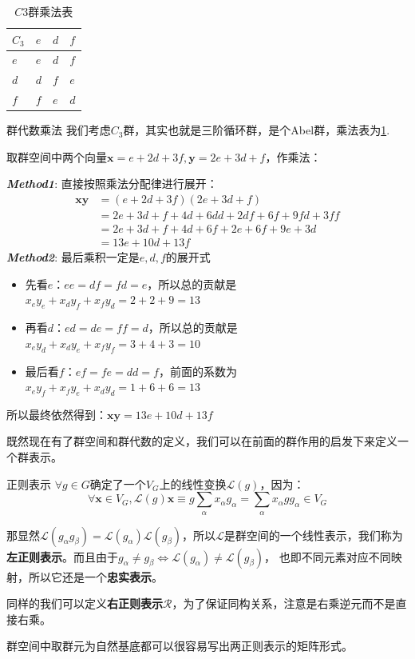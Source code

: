 \begin{table}[h]
    \centering
    \begin{tabular}{l|l|l|l}
    $C_3$ & $e$ & $d$ & $f$ \\ \hline
    $e$   & $e$ & $d$ & $f$ \\ \hline
    $d$   & $d$ & $f$ & $e$ \\ \hline
    $f$   & $f$ & $e$ & $d$
    \end{tabular}
    \caption{$C3$群乘法表}
    \label{tab:D.1}
\end{table}
\begin{example}{群代数乘法}
    我们考虑$C_3$群，其实也就是三阶循环群，是个Abel群，乘法表为\ref{tab:D.1}.

    取群空间中两个向量$\mathbf{x}=e+2d+3f,\mathbf{y}=2e+3d+f$，作乘法：
    
    {\itshape\textbf{Method1}}: 直接按照乘法分配律进行展开：
    \begin{align*}
        \mathbf{x}\mathbf{y}&=(e+2d+3f)(2e+3d+f)\\
        &=2e+3d+f+4d+6dd+2df+6f+9fd+3ff\\
        &=2e+3d+f+4d+6f+2e+6f+9e+3d\\
        &=13e+10d+13f
    \end{align*}
    {\itshape\textbf{Method2}}: 最后乘积一定是$e,d,f$的展开式
    \begin{itemize}
        \item 先看$e$：$ee=df=fd=e$，所以总的贡献是$x_ey_e+x_dy_f+x_fy_d=2+2+9=13$
        \item 再看$d$：$ed=de=ff=d$，所以总的贡献是$x_ey_d+x_dy_e+x_fy_f=3+4+3=10$
        \item 最后看$f$：$ef=fe=dd=f$，前面的系数为$x_ey_f+x_fy_e+x_dy_d=1+6+6=13$
    \end{itemize}
    
    所以最终依然得到：$\mathbf{x}\mathbf{y}=13e+10d+13f$
\end{example}

既然现在有了群空间和群代数的定义，我们可以在前面的群作用的启发下来定义一个群表示。
\begin{define}{正则表示}
    $\forall g\in G$确定了一个$V_G$上的线性变换$\mathscr{L}(g)$，因为：
    $$\forall \mathbf{x}\in V_G,\mathscr{L}(g)\mathbf{x}\equiv g\sum\limits_\alpha x_\alpha g_\alpha=\sum\limits_\alpha x_\alpha gg_\alpha\in V_G$$

    \setlength\parindent{2em}那显然$\mathscr{L}(g_\alpha g_\beta)=\mathscr{L}(g_\alpha)\mathscr{L}( g_\beta)$，所以$\mathscr{L}$是群空间的一个线性表示，我们称为\textbf{左正则表示}。而且由于$g_\alpha\neq g_\beta\iff\mathscr{L}(g_\alpha)\neq \mathscr{L}(g_\beta)$，
    也即不同元素对应不同映射，所以它还是一个\textbf{忠实表示}。

    \setlength\parindent{2em}同样的我们可以定义\textbf{右正则表示}$\mathscr{R}$，为了保证同构关系，注意是右乘逆元而不是直接右乘。

    \setlength\parindent{2em}群空间中取群元为自然基底都可以很容易写出两正则表示的矩阵形式。
\end{define}

